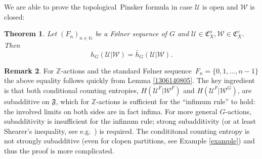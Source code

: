\documentclass[12pt]{amsart}
\newtheorem{theorem}{Theorem}[section]
\theoremstyle{definition}
\newtheorem{remark}[theorem]{Remark}
\numberwithin{equation}{section}
\newcommand{\CU}{\mathcal{U}}
\newcommand{\CW}{\mathcal{W}}
\newcommand{\GC}{\mathfrak{C}}
\def \Z {\mathbb Z}
\def \sq {sequence}
\def \tl {topological}
\def \Z {\mathbb Z}
\def \CU {\mathcal U}
\def \sq {sequence}
\def \tl {topological}
\begin{document}
We are able to prove the \tl\ Pinsker formula in case $\CU$ is open and $\CW$ is closed:

\begin{theorem} \label{1007031233}
Let $(F_n)_{n\in \mathbb{N}}$ be a F\o lner sequence of $G$ and $\CU\in \GC_X^o,\CW\in\GC_X^c$. Then
$$
h_G(\CU|\CW)= \bar h_G(\CU|\CW).
$$
\end{theorem}

\begin{remark}
For $\mathbb{Z}$-actions and the standard F\o lner \sq\ $F_n= \{0,1,\dots,n-1\}$ the above equality follows quickly from Lemma \ref{1306140805}. The key ingredient is that both conditional counting entropies, $H(\CU^{F}|\CW^{F})$ and $H(\CU^{F}|\CW^G)$, are subadditive on $\mathfrak F$, which for $\Z$-actions is sufficient for the ``infimum rule'' to hold: the involved limits on both sides are in fact infima. For more general $G$-actions, subadditivity is insufficient for the infimum rule; strong subadditivity (or at least Shearer's inequality, see e.g.\ \cite{DFR}) is required. The condititonal counting entropy is not strongly subadditive (even for clopen partitions, see Example \ref{example}) and thus the proof is more complicated.
\end{remark}
\end{document}

